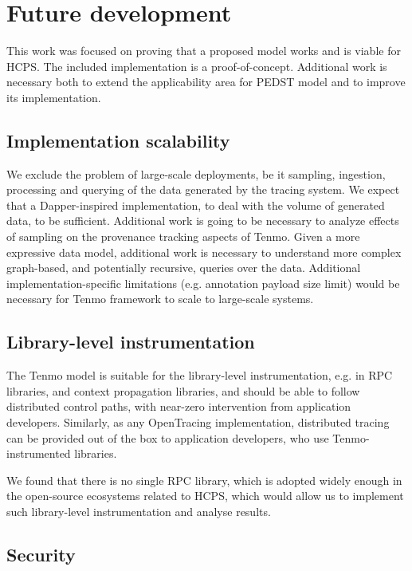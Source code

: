 \section{Future development}

This work was focused on proving that a proposed model works and is viable for HCPS. The included implementation is a proof-of-concept. Additional work is necessary both to extend the applicability area for PEDST model and to improve its implementation.

\subsection{Implementation scalability}

We exclude the problem of large-scale deployments, be it sampling, ingestion, processing and querying of the data generated by the tracing system. We expect that a Dapper-inspired implementation, to deal with the volume of generated data, to be sufficient. Additional work is going to be necessary to analyze effects of sampling on the provenance tracking aspects of Tenmo. Given a more expressive data model, additional work is necessary to understand  more complex graph-based, and potentially recursive, queries over the data. Additional implementation-specific limitations (e.g. annotation payload size limit) would be necessary for Tenmo framework to scale to large-scale systems.

\subsection{Library-level instrumentation}

The Tenmo model is suitable for the library-level instrumentation, e.g. in RPC libraries, and context propagation libraries, and should be able to follow distributed control paths, with near-zero intervention from application developers. Similarly, as any OpenTracing implementation, distributed tracing can be provided out of the box to application developers, who use Tenmo-instrumented libraries.

We found that there is no single RPC library, which is adopted widely enough in the open-source ecosystems related to HCPS, which would allow us to implement such library-level instrumentation and analyse results.


\subsection{Security}

